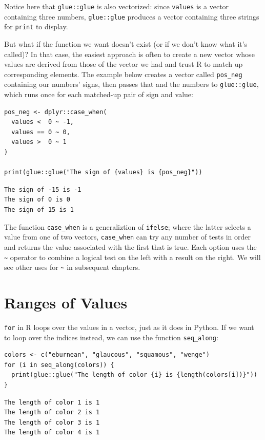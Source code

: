 \noindent
Notice here that \texttt{glue::glue} is also vectorized:
since \texttt{values} is a vector containing three numbers,
\texttt{glue::glue} produces a vector containing three strings
for \texttt{print} to display.

But what if the function we want doesn't exist
(or if we don't know what it's called)?
In that case,
the easiest approach is often to create a new vector
whose values are derived from those of the vector we had
and trust R to match up corresponding elements.
The example below creates a vector called \texttt{pos\_neg} containing our numbers' signs,
then passes that and the numbers to \texttt{glue::glue},
which runs once for each matched-up pair of sign and value:

\begin{lstlisting}
pos_neg <- dplyr::case_when(
  values <  0 ~ -1,
  values == 0 ~ 0,
  values >  0 ~ 1
)

print(glue::glue("The sign of {values} is {pos_neg}"))
\end{lstlisting}

\begin{lstlisting}
The sign of -15 is -1
The sign of 0 is 0
The sign of 15 is 1
\end{lstlisting}

The function \texttt{case\_when} is a generaliztion of \texttt{ifelse};
where the latter selects a value from one of two vectors,
\texttt{case\_when} can try any number of tests in order
and returns the value associated with the first that is true.
Each option uses the \texttt{{\textasciitilde}} operator to combine
a logical test on the left with a result on the right.
We will see other uses for \texttt{{\textasciitilde}} in subsequent chapters.

\section{Ranges of Values}

\texttt{for} in R loops over the values in a vector,
just as it does in Python.
If we want to loop over the indices instead,
we can use the function \texttt{seq\_along}:

\begin{lstlisting}
colors <- c("eburnean", "glaucous", "squamous", "wenge")
for (i in seq_along(colors)) {
  print(glue::glue("The length of color {i} is {length(colors[i])}"))
}
\end{lstlisting}

\begin{lstlisting}
The length of color 1 is 1
The length of color 2 is 1
The length of color 3 is 1
The length of color 4 is 1
\end{lstlisting}

